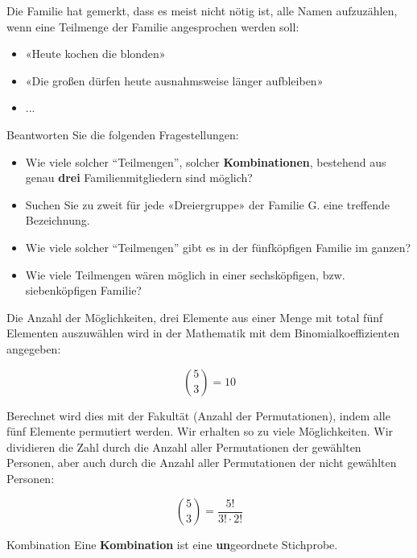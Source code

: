 Die Familie hat gemerkt, dass es meist nicht nötig ist, alle Namen
aufzuzählen, wenn eine Teilmenge der Familie angesprochen werden soll:

\begin{itemize}
\item «Heute kochen die blonden»
\item «Die großen dürfen heute ausnahmsweise länger aufbleiben»
\item ...
\end{itemize}

\newpage
Beantworten Sie die folgenden Fragestellungen:
\begin{itemize}
\item Wie viele solcher ``Teilmengen'', solcher \textbf{Kombinationen}, bestehend aus genau \textbf{drei} Familienmitgliedern sind möglich?


\item Suchen Sie zu zweit für jede «Dreiergruppe» der Familie G. eine
treffende Bezeichnung.


\item Wie viele solcher ``Teilmengen'' gibt es in der
fünfköpfigen Familie im ganzen?
\item Wie viele Teilmengen wären möglich in einer sechsköpfigen,
bzw. siebenköpfigen Familie?
\end{itemize}

Die Anzahl der Möglichkeiten, drei Elemente aus einer Menge mit total
fünf Elementen auszuwählen wird in der Mathematik mit dem
Binomialkoeffizienten angegeben:

$${5\choose 3} = 10$$

Berechnet wird dies mit der Fakultät (Anzahl der Permutationen), indem
alle fünf Elemente permutiert werden. Wir erhalten so zu viele
Möglichkeiten. Wir dividieren die Zahl durch die Anzahl aller Permutationen der
gewählten Personen, aber auch durch die Anzahl aller Permutationen der
nicht gewählten Personen:

$${5\choose 3} = \frac{5!}{3!\cdot{} 2!}$$
\newpage

\begin{definition}{Kombination}{}
Eine \textbf{Kombination} ist eine \textbf{un}geordnete Stichprobe.
\end{definition}

